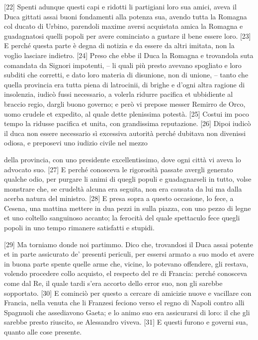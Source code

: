 {[}22{]} Spenti adunque questi capi e ridotti li partigiani loro sua
amici, aveva il Duca gittati assai buoni fondamenti alla potenza sua,
avendo tutta la Romagna col ducato di Urbino, parendoli maxime aversi
acquistata amica la Romagna e guadagnatosi quelli popoli per avere
cominciato a gustare il bene essere loro. {[}23{]} E perché questa parte
è degna di notizia e da essere da altri imitata, non la voglio lasciare
indietro. {[}24{]} Preso che ebbe il Duca la Romagna e trovandola suta
comandata da Signori impotenti, -- li quali più presto avevano spogliato
e loro subditi che corretti, e dato loro materia di disunione, non di
unione, -- tanto che quella provincia era tutta piena di latrocinii, di
brighe e d'ogni altra ragione di insolenzia, iudicò fussi necessario, a
volerla ridurre pacifica et ubbidiente al braccio regio, dargli buono
governo; e però vi prepose messer Remirro de Orco, uomo crudele et
expedito, al quale dette plenissima potestà. {[}25{]} Costui im poco
tempo la ridusse pacifica et unita, con grandissima reputazione.
{[}26{]} Dipoi iudicò il duca non essere necessario sì excessiva
autorità perché dubitava non divenissi odiosa, e preposevi uno iudizio
civile nel mezzo \linebreak

\quebra

\noindent{}della provincia, con uno presidente excellentissimo,
dove ogni città vi aveva lo advocato suo. {[}27{]} E perché conosceva le
rigorosità passate avergli generato qualche odio, per purgare li animi
di quegli populi e guadagnarseli in tutto, volse monstrare che, se
crudeltà alcuna era seguita, non era causata da lui ma dalla acerba
natura del ministro. {[}28{]} E presa sopra a questo occasione, lo fece,
a Cesena, una mattina mettere in dua pezzi in sulla piazza, con uno
pezzo di legne et uno coltello sanguinoso accanto; la ferocità del quale
spettaculo fece quegli popoli in uno tempo rimanere satisfatti e
stupidi.

{[}29{]} Ma torniamo donde noi partimmo. Dico che, trovandosi il Duca
assai potente et in parte assicurato de' presenti periculi, per essersi
armato a suo modo et avere in buona parte spente quelle arme che,
vicine, lo potevano offendere, gli restava, volendo procedere collo
acquisto, el respecto del re di Francia: perché conosceva come dal Re,
il quale tardi s'era accorto dello error suo, non gli sarebbe
sopportato. {[}30{]} E cominciò per questo a cercare di amicizie nuove e
vacillare con Francia, nella venuta che li Franzesi feciono verso el
regno di Napoli contro alli Spagnuoli che assediavono Gaeta; e lo animo
suo era assicurarsi di loro: il che gli sarebbe presto riuscito, se
Alessandro viveva. {[}31{]} E questi furono e governi sua, quanto alle
cose presente.

